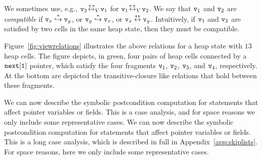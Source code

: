 We sometimes use, e.g., $\mathtt{v}_2 \!  \overset{+*}\leftrightarrow_{V}  \! \mathtt{v}_1$ for
$\mathtt{v}_1 \!  \overset{*+}\leftrightarrow_{V}  \! \mathtt{v}_2$.
We say that $\mathtt{v}_1$ and $\mathtt{v}_2$ are {\em compatible} if $\mathtt{v}_x \overset{*}\hookrightarrow \mathtt{v}_y$, or $\mathtt{v}_y \overset{*}\hookrightarrow \mathtt{v}_x$, or $\mathtt{v}_x \overset{**}\leftrightarrow \mathtt{v}_y$. Intuitively, if $\mathtt{v}_1$ and
$\mathtt{v}_2$ are satisfied by two cells in the same heap state, then they must
be compatible.


Figure~\ref{fig:viewrelations} illustrates the above relations for a heap state
with $13$ heap cells. The figure depicts, in green,
four pairs of heap cells connected by a $\tt next[1]$ pointer, which satisfy
the four fragments $\mathtt{v}_1$, $\mathtt{v}_2$, $\mathtt{v}_3$, and $\mathtt{v}_4$, respectively.
At the bottom are depicted the transitive-closure like relations that hold
between these fragments.

\ifesop
We can now describe the symbolic postcondition computation for
statements that affect pointer variables or fields. This is a 
case analysis, and
for space reasons we only include some representative cases.
\else
We can now describe the symbolic postcondition computation for
statements that affect pointer variables or fields. This is a long
case analysis, which is described in full in Appendix~\ref{app:skiplists}.
For space reasons, here we only include some representative cases.
\fi

